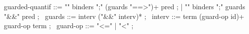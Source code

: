 \begin{syntax}
  guarded-quantif ::= "\forall" binders ";" (guards "==>")+ pred ;
       | "\exists" binders ";" guards "&&" pred ;
  \
  guards ::= interv  ("&&" interv)* ;
  \
  interv  ::= term (guard-op id)+ guard-op term ;
  \
  guard-op ::= "<=" | "<" ;
\end{syntax}
